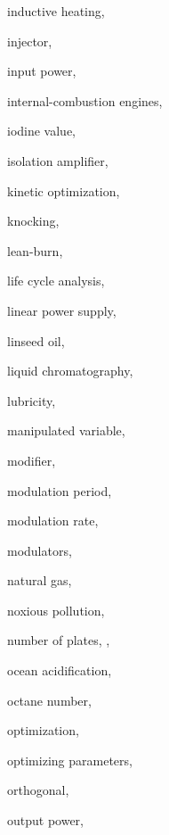 \begin{theindex}
  \item \lowercase {inductive heating}, 
  \item \lowercase {injector}, 
  \item \lowercase {input power}, 
  \item \lowercase {internal\hyp  {}combustion engines}, 
  \item \lowercase {iodine value}, 
  \item \lowercase {isolation amplifier}, 
  \item \lowercase {kinetic optimization}, 
  \item \lowercase {knocking}, 
  \item \lowercase {lean-burn}, 
  \item \lowercase {life cycle analysis}, 
  \item \lowercase {linear power supply}, 
  \item \lowercase {linseed oil}, 
  \item \lowercase {liquid chromatography}, 
  \item \lowercase {lubricity}, 
  \item \lowercase {manipulated variable}, 
  \item \lowercase {modifier}, 
  \item \lowercase {modulation period}, 
  \item \lowercase {modulation rate}, 
  \item \lowercase {modulators}, 
  \item \lowercase {natural gas}, 
  \item \lowercase {noxious pollution}, 
  \item \lowercase {number of plates}, , 
  \item \lowercase {ocean acidification}, 
  \item \lowercase {octane number}, 
  \item \lowercase {optimization}, 
  \item \lowercase {optimizing parameters}, 
  \item \lowercase {orthogonal}, 
  \item \lowercase {output power}, 

\end{theindex}
